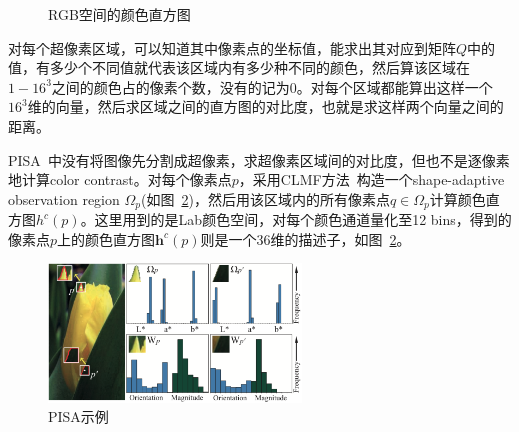 \documentclass[12pt]{article}
\begin{document}
\begin{figure}
  \centering 
  \caption{RGB空间的颜色直方图}    
  \label{fig: RGBhistogram} %
\end{figure}

对每个超像素区域，可以知道其中像素点的坐标值，能求出其对应到矩阵$Q$中的值，有多少个不同值就代表该区域内有多少种不同的颜色，然后算该区域在$1-16^3$之间的颜色占的像素个数，没有的记为0。对每个区域都能算出这样一个$16^3$维的向量，然后求区域之间的直方图的对比度，也就是求这样两个向量之间的距离。

PISA~\cite{shi2013pisa}中没有将图像先分割成超像素，求超像素区域间的对比度，但也不是逐像素地计算color contrast。对每个像素点$p$，采用CLMF方法~\cite{lu2012cross}构造一个shape-adaptive observation region $\Omega_p$(如图~\ref{fig: PISA示例})，然后用该区域内的所有像素点$q \in \Omega_p$计算颜色直方图$h^c(p)$。这里用到的是Lab颜色空间，对每个颜色通道量化至12 bins，得到的像素点$p$上的颜色直方图$\mathbf{h}^c(p)$则是一个36维的描述子，如图~\ref{fig: PISA示例}。

\begin{figure}[!ht]
\centering
\includegraphics[width=0.6\textwidth]{PISA示例}
\caption{PISA示例}
\label{fig: PISA示例}
\end{figure} 
\end{document}
